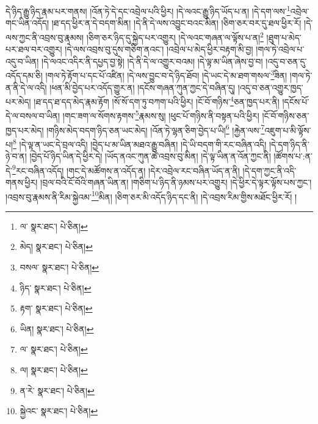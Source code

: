 དེ་ཉིད་རྒྱུ་ཉིད་རྣམ་པར་གནས། །འོན་ཏེ་དེ་དང་འབྲེལ་པའི་ཕྱིར། །དེ་ལའང་རྒྱུ་ཉིད་ཡོད་པ་ན། །དེ་དག་ལས་\footnote{ལ་  སྣར་ཐང་།  པེ་ཅིན། }འབྲེལ་གང་ཡིན་འདོད། །ཐ་དད་ཕྱིར་ན་དེ་བདག་མིན། །དེ་ནི་དེ་ལས་འབྱུང་བའང་མིན། །ཅིག་ཅར་བར་དུ་ཐལ་ཕྱིར་རོ། །དེ་ལས་ཀྱང་ནི་འབྲས་བུ་རྣམས། །ཅིག་ཅར་ཉིད་དུ་སྐྱེད་པར་འགྱུར། །དེ་ལའང་གཞན་ལ་ལྟོས་པ་ན།\footnote{མེད།  སྣར་ཐང་།  པེ་ཅིན། } །ཐུག་པ་མེད་པར་ཐལ་བར་འགྱུར། །དེ་ལས་འབྲས་བུ་དུས་གཅིག་ནའང་། །འབྲེལ་པ་མེད་ཕྱིར་བརྟག་མི་བྱ། །གལ་ཏེ་འབྲེལ་པ་འདུ་བ་ཡིན། །དེ་ལའང་འདིར་ནི་དཔྱད་བྱ་སྟེ། །དེ་ནི་དེ་ལ་འགྱུར་བའམ། །དེ་ལྟ་མ་ཡིན་ཞེས་བྱ་བ། །འདུ་བ་ཅན་དུ་འདོད་དམ་ཅི། །གལ་ཏེ་རྟོག་པ་དང་པོ་འཛིན། །དེ་ལས་བྱུང་བ་དེ་ཉིད་ཐོབ། །དེ་ཡང་དེ་མ་ཐག་གསལ་\footnote{བསལ་  སྣར་ཐང་།  པེ་ཅིན། }ཟིན། །གལ་ཏེ་ན་ནི་དེ་ལ་འདི། །ཕན་མི་བྱེད་པར་འདོད་གྱུར་ན། །དངོས་གཞན་ཀུན་ཀྱང་དེ་བཞིན་དུ། །འདུ་བ་ཅན་འགྱུར་ཁྱད་པར་མེད། །ཐ་དད་ཐ་དད་མེད་རྣམ་རྟོག །སོ་སོ་དག་ཏུ་བཀག་པའི་ཕྱིར། །ངོ་བོ་གཉིས་\footnote{ཉིད་  སྣར་ཐང་།  པེ་ཅིན། }ཅན་ཁྱད་པར་ནི། །དངོས་པོ་དེ་ལ་བསལ་བ་ཡིན། །གང་ཟག་ལ་སོགས་རྟགས་\footnote{རྟག་  སྣར་ཐང་།  པེ་ཅིན། }རྣམས་སུ། །ཕུང་པོ་གཉིས་ནི་བསྟན་པའི་ཕྱིར། །ངོ་བོ་གཉིས་ཅན་ཁྱད་པར་མེད། །གཉིས་མེད་བདག་ཉིད་ཅན་ཡང་མེད། །འོན་ཏེ་ལྷན་ཅིག་བྱེད་པ་ཡི།\footnote{ཡིན།  སྣར་ཐང་།  པེ་ཅིན། } །རྐྱེན་ལས་\footnote{ལ་  སྣར་ཐང་།  པེ་ཅིན། }འཇུག་པ་མི་ལྟོས་པ།\footnote{ལ།  སྣར་ཐང་།  པེ་ཅིན། } །དེ་ལྟ་ན་ཡང་དེ་བྲལ་འདི། །བྱེད་པ་མ་ཡིན་མཐའ་རྒྱུ་བཞིན། །དེ་ཡི་བདག་གི་རང་བཞིན་འདི། །དེ་དག་ཉིད་ནི་ཉེ་བ་ན། །བྱེད་པོ་ཉིད་ཡིན་དེ་ཕྱིར་དེ། །ཡོད་ནའང་ཀུན་ཚེ་འབྲས་བུ་མིན། །དེ་ལྟ་ཡིན་ན་འོན་ཀྱང་ནི། །ཚོགས་པ་:ན་དེ་\footnote{ན་རེ་  སྣར་ཐང་།  པེ་ཅིན། }རང་བཞིན་འདོད། །གང་དེ་མཚོགས་ན་འདོད་ན། །དེར་འབྲེལ་རང་བཞིན་ཡོད་ན་ནི། །དེ་དག་ཀྱང་ནི་འདི་གནས་ཕྱིར། །བྲལ་བའི་ངོ་བོའི་གཞན་ཡིན་ན། །གཅིག་པ་ཉིད་ནི་ཉམས་པར་འགྱུར། །དེ་ཕྱིར་དེ་ལྟར་ལྟོས་པས་ཀྱང་། །འབྲས་བུ་རྣམས་ནི་རིམ་སྐྱེའམ་\footnote{སྐྱེའང་  སྣར་ཐང་།  པེ་ཅིན། }མིན། །ཅིག་ཅར་མི་འདོད་ཉིད་དང་ནི། །དེ་འབྲས་རིམ་གྱིས་མཐོང་ཕྱིར་རོ། །
